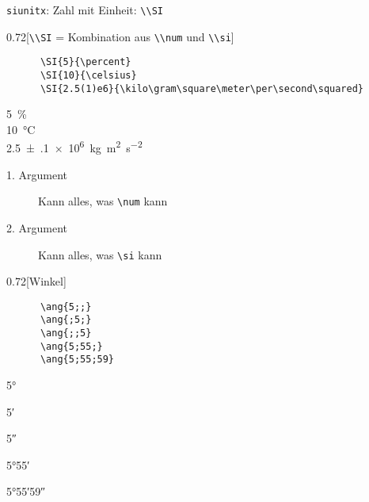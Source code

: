 \begin{frame}[fragile]{\texttt{siunitx}: Zahl mit Einheit: \lstinline+\\SI+}
  \begin{CodeExample}{0.72}[\lstinline+\\SI+ {=} Kombination aus \lstinline+\\num+ und \lstinline+\\si+]
    \begin{lstlisting}
      \SI{5}{\percent}
      \SI{10}{\celsius}
      \SI{2.5(1)e6}{\kilo\gram\square\meter\per\second\squared}
    \end{lstlisting}
  \CodeResult
    \strut
    \SI{5}{\percent} \\
    \SI{10}{\celsius} \\
    \SI{2.5(1)e6}{\kilo\gram\square\meter\per\second\squared}
  \end{CodeExample}
  \begin{description}
    \item[1. Argument] Kann alles, was \lstinline+\num+ kann
    \item[2. Argument] Kann alles, was \lstinline+\si+ kann
  \end{description}
  \begin{CodeExample}{0.72}[Winkel]
    \begin{lstlisting}
      \ang{5;;}
      \ang{;5;}
      \ang{;;5}
      \ang{5;55;}
      \ang{5;55;59}
    \end{lstlisting}
  \CodeResult
    \strut\ang{5;;}\\
    \strut\ang{;5;}\\
    \strut\ang{;;5}\\
    \strut\ang{5;55;}\\
    \strut\ang{5;55;59}\\
  \end{CodeExample}
\end{frame}
